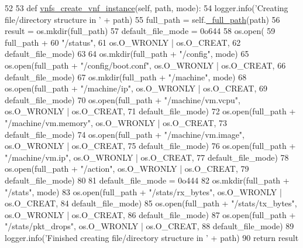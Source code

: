\begin{DoxyCode}
52 
53     \textcolor{keyword}{def }\hyperlink{classvnfs__operations_1_1VNFSOperations_ae73c421b301cbda862896f9fe67a7941}{vnfs\_create\_vnf\_instance}(self, path, mode):
54         logger.info(\textcolor{stringliteral}{'Creating file/directory structure in '} + path)
55         full\_path = self.\hyperlink{classvnfs__operations_1_1VNFSOperations_ac5bd7d7dee80807e14bd3d4446603e32}{\_full\_path}(path)
56         result = os.mkdir(full\_path)
57         default\_file\_mode = 0o644
58         os.open(
59             full\_path +
60             \textcolor{stringliteral}{"/status"},
61             os.O\_WRONLY | os.O\_CREAT,
62             default\_file\_mode)
63 
64         os.mkdir(full\_path + \textcolor{stringliteral}{"/config"}, mode)
65         os.open(full\_path + \textcolor{stringliteral}{"/config/boot.conf"}, os.O\_WRONLY | os.O\_CREAT,
66                 default\_file\_mode)
67         os.mkdir(full\_path + \textcolor{stringliteral}{"/machine"}, mode)
68         os.open(full\_path + \textcolor{stringliteral}{"/machine/ip"}, os.O\_WRONLY | os.O\_CREAT,
69                 default\_file\_mode)
70         os.open(full\_path + \textcolor{stringliteral}{"/machine/vm.vcpu"}, os.O\_WRONLY | os.O\_CREAT,
71                 default\_file\_mode)
72         os.open(full\_path + \textcolor{stringliteral}{"/machine/vm.memory"}, os.O\_WRONLY | os.O\_CREAT,
73                 default\_file\_mode)
74         os.open(full\_path + \textcolor{stringliteral}{"/machine/vm.image"}, os.O\_WRONLY | os.O\_CREAT,
75                 default\_file\_mode)
76         os.open(full\_path + \textcolor{stringliteral}{"/machine/vm.ip"}, os.O\_WRONLY | os.O\_CREAT,
77                 default\_file\_mode)
78         os.open(full\_path + \textcolor{stringliteral}{"/action"}, os.O\_WRONLY | os.O\_CREAT,
79                 default\_file\_mode)
80 
81         default\_file\_mode = 0o444
82         os.mkdir(full\_path + \textcolor{stringliteral}{"/stats"}, mode)
83         os.open(full\_path + \textcolor{stringliteral}{"/stats/rx\_bytes"}, os.O\_WRONLY | os.O\_CREAT,
84                 default\_file\_mode)
85         os.open(full\_path + \textcolor{stringliteral}{"/stats/tx\_bytes"}, os.O\_WRONLY | os.O\_CREAT,
86                 default\_file\_mode)
87         os.open(full\_path + \textcolor{stringliteral}{"/stats/pkt\_drops"}, os.O\_WRONLY | os.O\_CREAT,
88                 default\_file\_mode)
89         logger.info(\textcolor{stringliteral}{'Finished creating file/directory structure in '} + path)
90         \textcolor{keywordflow}{return} result

\end{DoxyCode}
